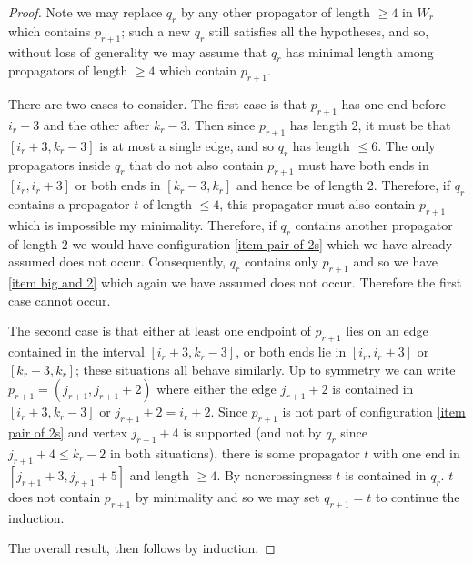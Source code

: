 \documentclass[11pt]{article}
\theoremstyle{remark}
\theoremstyle{definition}
\begin{document}
\begin{proof}
Note we may replace $q_r$ by any other propagator of length $\geq 4$ in $W_r$ which contains $p_{r+1}$; such a new $q_r$ still satisfies all the hypotheses, and so, without loss of generality we may assume that $q_r$ has minimal length among propagators of length $\geq 4$ which contain $p_{r+1}$.  

There are two cases to consider.
The first case is that $p_{r+1}$ has one end before $i_r+3$ and the other after $k_r-3$.  Then since $p_{r+1}$ has length 2, it must be that $[i_r+3,k_r-3]$ is at most a single edge, and so $q_r$ has length $\leq 6$.  The only propagators inside $q_r$ that do not also contain $p_{r+1}$ must have both ends in $[i_r, i_r+3]$ or both ends in $[k_r-3, k_r]$ and hence be of length 2.  Therefore, if $q_r$ contains a propagator $t$ of length $\leq 4$, this propagator must also contain $p_{r+1}$ which is impossible my minimality.  Therefore, if $q_r$ contains another propagator of length $2$ we would have configuration \ref{item pair of 2s} which we have already assumed does not occur.  Consequently, $q_r$ contains only $p_{r+1}$ and so we have \ref{item big and 2} which again we have assumed does not occur.
Therefore the first case cannot occur.

The second case is that either at least one endpoint of $p_{r+1}$ lies on an edge contained in the interval $[i_r+3,k_r-3]$, or both ends lie in $[i_r, i_r+3]$ or $[k_r-3, k_r]$; these situations all behave similarly.  Up to symmetry we can write $p_{r+1} = (j_{r+1}, j_{r+1}+2)$ where either the edge $j_{r+1}+2$ is contained in $[i_r+3, k_r-3]$ or $j_{r+1}+2 = i_r+2$.  Since $p_{r+1}$ is not part of configuration \ref{item pair of 2s} and vertex $j_{r+1}+4$ is supported (and not by $q_r$ since $j_{r+1}+4 \leq k_r-2$ in both situations), there is some propagator $t$ with one end in $[j_{r+1}+3, j_{r+1}+5]$ and length $\geq 4$.  By noncrossingness $t$ is contained in $q_{r}$.  $t$ does not contain $p_{r+1}$ by minimality and so we may set $q_{r+1} = t$ to continue the induction.  

The overall result, then follows by induction.


\end{proof}
\end{document}
